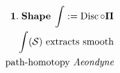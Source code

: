 \documentclass[preview]{standalone}
\begin{document}
\begin{align*}
\special{dvisvgm:raw <g id='unique000'>}\mathbf{1.\;Shape\;\int := \operatorname{Disc}\circ\Pi}\\\int(\mathcal{S})\text{ extracts smooth}\\\text{path-homotopy }\textit{Aeondyne}\special{dvisvgm:raw </g>}
\end{align*}
\end{document}
